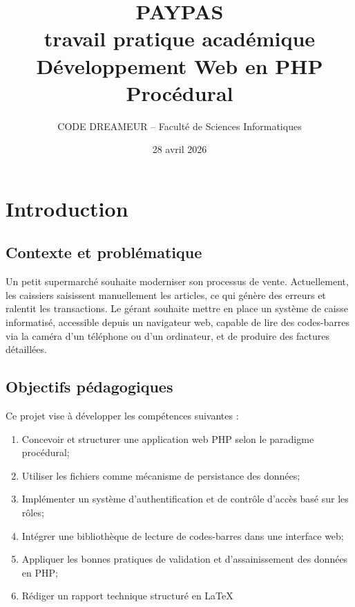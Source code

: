 \documentclass[12pt,a4paper,french]{report}
\title{%
    \textbf{PAYPAS} \\[0.5cm]
    \textbf{travail pratique académique} \\[1cm]
    Développement Web en PHP Procédural \\[0.5cm]
}
\author{CODE DREAMEUR -- Faculté de Sciences Informatiques}
\date{28 avril 2026}
\begin{document}
\maketitle

\newpage

\tableofcontents

\newpage

\chapter{Introduction}

\section{Contexte et problématique}

Un petit supermarché souhaite moderniser son processus de vente. Actuellement, les caissiers saisissent manuellement 
les articles, ce qui génère des erreurs et ralentit les transactions. Le gérant souhaite mettre en place un système de 
caisse informatisé, accessible depuis un navigateur web, capable de lire des codes-barres via la caméra d'un téléphone 
ou d'un ordinateur, et de produire des factures détaillées.

\section{Objectifs pédagogiques}

Ce projet vise à développer les compétences suivantes :

\begin{enumerate}
    \item Concevoir et structurer une application web PHP selon le paradigme procédural;
    \item Utiliser les fichiers comme mécanisme de persistance des données;
    \item Implémenter un système d'authentification et de contrôle d'accès basé sur les rôles;
    \item Intégrer une bibliothèque de lecture de codes-barres dans une interface web;
    \item Appliquer les bonnes pratiques de validation et d'assainissement des données en PHP;
    \item Rédiger un rapport technique structuré en \LaTeX{}
\end{enumerate}
\end{document}
